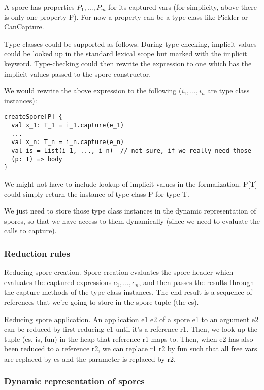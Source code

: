 \documentclass{llncs}
\begin{document}
A spore has properties $P_1, ..., P_m$ for its captured vars (for simplicity,
above there is only one property P). For now a property can be a type class
like Pickler or CanCapture.

Type classes could be supported as follows. During type checking, implicit
values could be looked up in the standard lexical scope but marked with the
implicit keyword. Type-checking could then rewrite the expression to one which
has the implicit values passed to the spore constructor.

We would rewrite the above expression to the following ($i_1, ..., i_n$ are type
class instances):

\begin{lstlisting}
createSpore[P] {
  val x_1: T_1 = i_1.capture(e_1)
  ...
  val x_n: T_n = i_n.capture(e_n)
  val is = List(i_1, ..., i_n)  // not sure, if we really need those
  (p: T) => body
}
\end{lstlisting}

We might not have to include lookup of implicit values in the formalization.
P[T] could simply return the instance of type class P for type T.

We just need to store those type class instances in the dynamic representation
of spores, so that we have access to them dynamically (since we need to
evaluate the calls to capture).

\subsubsection{Reduction rules}

Reducing spore creation. Spore creation evaluates the spore header which
evaluates the captured expressions $e_1, ..., e_n$, and then passes the results
through the capture methods of the type class instances. The end result is a
sequence of references that we're going to store in the spore tuple (the cs).

Reducing spore application. An application e1 e2 of a spore e1 to an argument
e2 can be reduced by first reducing e1 until it's a reference r1. Then, we
look up the tuple (cs, is, fun) in the heap that reference r1 maps to. Then,
when e2 has also been reduced to a reference r2, we can replace r1 r2 by fun
such that all free vars are replaced by cs and the parameter is replaced by
r2.

\subsubsection{Dynamic representation of spores}
\end{document}
